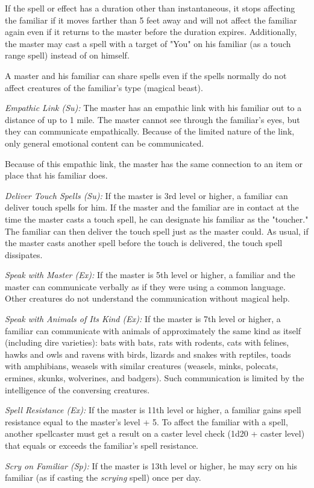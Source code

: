 If the spell or effect has a duration other than instantaneous, it stops affecting the familiar if it moves farther than 5 feet away and will not affect the familiar again even if it returns to the master before the duration expires. Additionally, the master may cast a spell with a target of "You" on his familiar (as a touch range spell) instead of on himself.

A master and his familiar can share spells even if the spells normally do not affect creatures of the familiar's type (magical beast).

\textit{Empathic Link (Su):} The master has an empathic link with his familiar out to a distance of up to 1 mile. The master cannot see through the familiar's eyes, but they can communicate empathically. Because of the limited nature of the link, only general emotional content can be communicated.

Because of this empathic link, the master has the same connection to an item or place that his familiar does.

\textit{Deliver Touch Spells (Su):} If the master is 3rd level or higher, a familiar can deliver touch spells for him. If the master and the familiar are in contact at the time the master casts a touch spell, he can designate his familiar as the "toucher." The familiar can then deliver the touch spell just as the master could. As usual, if the master casts another spell before the touch is delivered, the touch spell dissipates.

\textit{Speak with Master (Ex):} If the master is 5th level or higher, a familiar and the master can communicate verbally as if they were using a common language. Other creatures do not understand the communication without magical help.

\textit{Speak with Animals of Its Kind (Ex):} If the master is 7th level or higher, a familiar can communicate with animals of approximately the same kind as itself (including dire varieties): bats with bats, rats with rodents, cats with felines, hawks and owls and ravens with birds, lizards and snakes with reptiles, toads with amphibians, weasels with similar creatures (weasels, minks, polecats, ermines, skunks, wolverines, and badgers). Such communication is limited by the intelligence of the conversing creatures.

\textit{Spell Resistance (Ex):} If the master is 11th level or higher, a familiar gains spell resistance equal to the master's level + 5. To affect the familiar with a spell, another spellcaster must get a result on a caster level check (1d20 + caster level) that equals or exceeds the familiar's spell resistance.

\textit{Scry on Familiar (Sp):} If the master is 13th level or higher, he may scry on his familiar (as if casting the \textit{scrying }spell) once per day.
